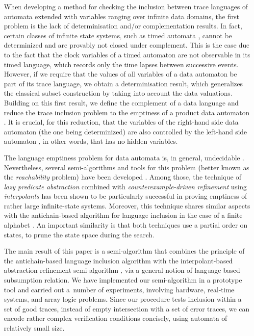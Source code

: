 \documentclass{llncs}
\begin{document}
When developing a method for checking the inclusion between trace
languages of automata extended with variables ranging over infinite
data domains, the first problem is the lack of determinisation and/or
complementation results. In fact, certain classes of infinite state
systems, such as timed automata \cite{AlurDill94}, cannot be
determinized and are provably not closed under complement. This is the
case due to the fact that the clock variables of a timed automaton are
not observable in its timed language, which records only the time
lapses between successive events. However, if we require that the
values of all variables of a data automaton be part of its trace
language, we obtain a determinisation result, which generalizes the
classical subset construction by taking into account the data
valuations. Building on this first result, we define the complement of
a data language and reduce the trace inclusion problem to the
emptiness of a product data automaton . It is crucial, for this reduction, that
the variables  of the right-hand side data automaton 
(the one being determinized) are also controlled by the left-hand side
automaton , in other words, that  has no hidden variables.

The language emptiness problem for data automata is, in general,
undecidable \cite{minsky67}. Nevertheless, several semi-algorithms and
tools for this problem (better known as the \emph{reachability}
problem) have been developed
\cite{fast,blast,mcmillan06,rybal-pldi11}. Among those, the technique
of \emph{lazy predicate abstraction} \cite{blast} combined with
\emph{counterexample-driven refinement} using \emph{interpolants}
\cite{mcmillan06} has been shown to be particularly successful in
proving emptiness of rather large infinite-state systems. Moreover,
this technique shares similar aspects with the antichain-based
algorithm for language inclusion in the case of a finite alphabet
\cite{abdulla}. An important similarity is that both techniques use a
partial order on states, to prune the state space during the search.

The main result of this paper is a semi-algorithm that combines the
principle of the antichain-based language inclusion algorithm
\cite{abdulla} with the interpolant-based abstraction refinement
semi-algorithm \cite{mcmillan06}, via a general notion of
language-based subsumption relation. We have implemented our
semi-algorithm in a prototype tool and carried out a~number of
experiments, involving hardware, real-time systems, and array logic
problems. Since our procedure tests inclusion within a set of good
traces, instead of empty intersection with a set of error traces, we
can encode rather complex verification conditions concisely, using
automata of relatively small size.
\end{document}
